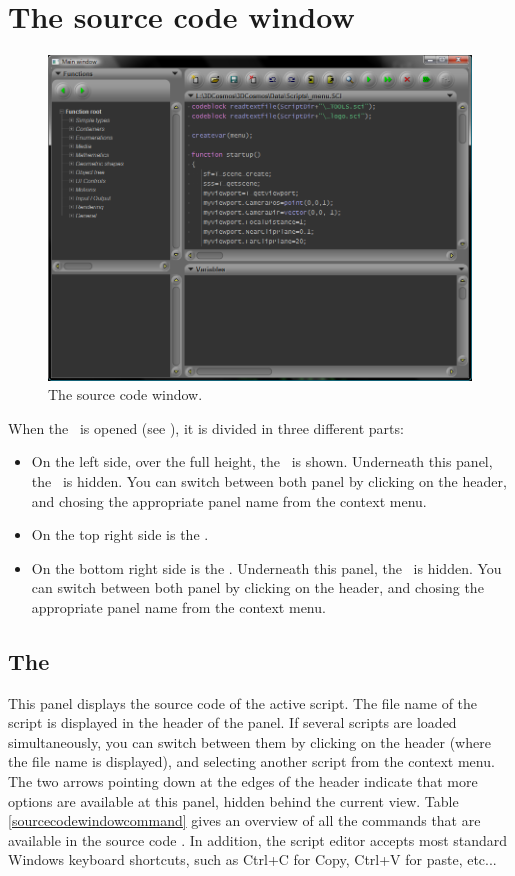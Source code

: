 \section{The source code window}
\begin{figure}
\includegraphics[scale=0.4]{bitmaps/sourcecodewindow.png}
\caption{The source code window.}
\label{sourcecodewindow}
\end{figure}
When the \sourcewin\ is opened (see ), it is divided in three different parts:
\begin{itemize}
\item On the left side, over the full height, the \functionspanel\ is shown. Underneath this panel, the \objectspanel\ is hidden. You can switch between both panel by clicking on the header, and chosing the appropriate panel name from the context menu.
\item On the top right side is the \sourcecodepanel.
\item On the bottom right side is the \varspanel. Underneath this panel, the \outputpanel\ is hidden. You can switch between both panel by clicking on the header, and chosing the appropriate panel name from the context menu.
\end{itemize}

\subsection{The \sourcecodepanel}
This panel displays the source code of the active script. The file name of the script is displayed in the header of the panel. If several scripts are loaded simultaneously, you can switch between them by clicking on the header (where the file name is displayed), and selecting another script from the context menu. The two arrows pointing down at the edges of the header indicate that more options are available at this panel, hidden behind the current view. Table \ref{sourcecodewindowcommand} gives an overview of all the commands that are available in the source code \sourcecodepanel. In addition, the script editor accepts most standard Windows keyboard shortcuts, such as Ctrl+C for Copy, Ctrl+V for paste, etc...

